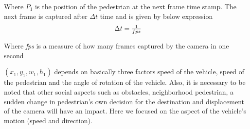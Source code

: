 Where ${P}_1$ is the position of the pedestrian at the next frame time stamp. The next frame is captured after $\Delta t$ time and is given by below expression
\begin{equation} \label{delta-t}
\begin{array}{l@{}}
\Delta t = \frac{1}{fps}
\end{array}
\end{equation}


Where \textit{fps} is a measure of how many frames captured by the camera in one second

$(x_1,y_1,w_1,h_1)$ depends on basically three factors speed of the vehicle, speed of the pedestrian and the angle of rotation of the vehicle. Also, it is necessary to be noted that other social aspects such as obstacles, neighborhood pedestrian, a sudden change in pedestrian's own decision for the destination and displacement of the camera will have an impact.
Here we focused on the aspect of the vehicle's motion (speed and direction).










